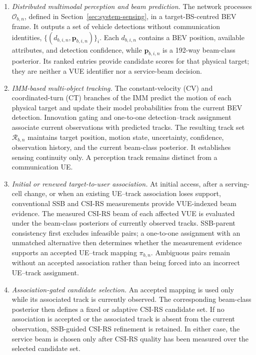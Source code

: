 \begin{enumerate}
    \item \emph{Distributed multimodal perception and beam
    prediction.}  The network processes \(\mathcal{O}_{b,n}\), defined in
    Section~\ref{sec:system-sensing}, in a target-BS-centred BEV frame.  It
    outputs a set of vehicle detections without communication identities,
    \(\{(d_{b,i,n},\mathbf{p}_{b,i,n})\}_i\).  Each \(d_{b,i,n}\) contains a
    BEV position, available attributes, and detection confidence, while
    \(\mathbf{p}_{b,i,n}\) is a 192-way beam-class posterior.  Its ranked
    entries provide candidate scores for that physical target; they are neither
    a VUE identifier nor a service-beam decision.

    \item \emph{IMM-based multi-object tracking.}  The constant-velocity (CV)
    and coordinated-turn (CT) branches of
    the IMM predict the motion of each physical target and update their model
    probabilities from the current BEV detection.  Innovation gating and
    one-to-one detection--track assignment associate current observations with
    predicted tracks.  The resulting track set \(\mathcal{R}_{b,n}\) maintains
    target position, motion state, uncertainty, confidence, observation
    history, and the current beam-class posterior.  It establishes sensing
    continuity only.  A perception track remains distinct from a communication
    UE.

    \item \emph{Initial or renewed target-to-user association.}  At initial
    access, after a serving-cell change, or when an existing UE--track
    association loses support, conventional SSB and CSI-RS measurements provide
    VUE-indexed beam
    evidence.  The measured CSI-RS beam of each affected VUE is evaluated under
    the beam-class posteriors of currently observed tracks.  SSB-parent
    consistency first excludes infeasible pairs; a one-to-one assignment with
    an unmatched alternative then determines whether the measurement evidence
    supports an accepted UE--track mapping \(\pi_{b,n}\).  Ambiguous pairs
    remain without an accepted association rather than being forced into an
    incorrect UE--track assignment.

    \item \emph{Association-gated candidate selection.}  An accepted mapping
    is used only while its associated track is currently observed.  The
    corresponding beam-class posterior then defines a fixed or adaptive CSI-RS
    candidate set.  If no association is accepted or the associated track is
    absent from the current observation, SSB-guided CSI-RS refinement is retained.
    In either case, the service beam is chosen only after CSI-RS quality has
    been measured over the selected candidate set.
\end{enumerate}

